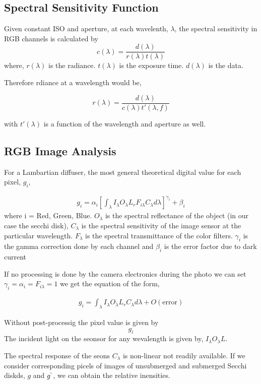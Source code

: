 \documentclass{article}
\begin{document}
\subsection{Spectral Sensitivity Function}

Given constant ISO and aperture, at each wavelenth, $ \lambda$, the spectral sensitivity
in RGB channels is calculated by
$$ c(\lambda) = \frac{d(\lambda)}{r(\lambda) t(\lambda)} $$
where, $ r(\lambda)$ is the radiance. $t(\lambda) $ is the exposure time.
$d(\lambda)$ is the data.

Therefore rdiance at a wavelength would be,

$$ r(\lambda) = \frac{d(\lambda)}{c(\lambda)t'(\lambda, f)} $$

with $t'(\lambda) $ is a function of the wavelength and aperture as well.

\subsection{RGB Image Analysis}
For a Lambartian diffuser, the most general theoretical digital value for each pixel, $ g_i$,

\begin{align}
  g_i = \alpha_i
  \left[\int_{\lambda}I_{\lambda}O_{\lambda} L_{r}F_{i\lambda}C_{\lambda} d\lambda\right]^{\gamma_{i}} + \beta_{i}
\end{align}
where i = {Red, Green, Blue}. $O_{\lambda}$ is the spectral reflectance of the object (in our case the secchi disk),
$C_{\lambda}$ is the spectral sensitivity of the image sensor at the particular wavelength.
$F_{\lambda}$ is the spectral transmittance of the color filters. $ \gamma_i$ is the gamma
correction done by each channel and $ \beta_{i}$ is the error factor due to dark current

If no processing is done by the camera electronics during the photo we can set
$ \gamma_i = \alpha_i = F_{i\lambda} =1$ we get the equation of the form,

\begin{align}
  g_i = \int_{\lambda} I_{\lambda}O_{\lambda} L_{r}C_{\lambda} d\lambda +O(\text{error})
\end{align}

Without post-processig the pixel value is given by
$$ g _i$$
The incident light on the seonsor for any wevalength is given by, $I_{\lambda} O_{\lambda} L$.

The spectral response of the seons $ C_\lambda$ is non-linear not readily available.
If we consider corresponding picels of images of unsubmerged and submerged Secchi
diskds, $ g$ and $g^`$, we can obtain the relative inensities.
\end{document}
